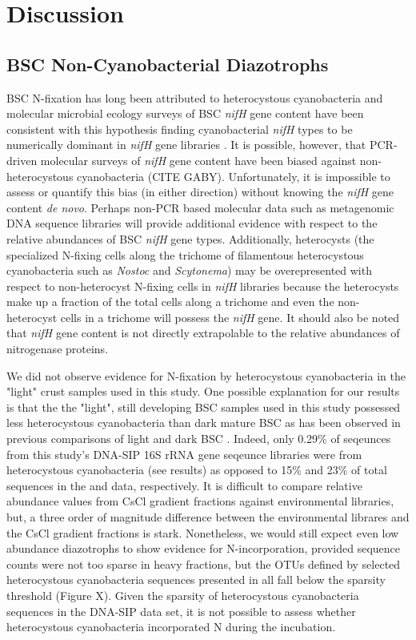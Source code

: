 \section{Discussion}

\subsection{BSC Non-Cyanobacterial Diazotrophs}
BSC N-fixation has long been attributed to heterocystous cyanobacteria and molecular microbial ecology surveys of BSC \textit{nifH} gene content have been consistent with this hypothesis finding cyanobacterial \textit{nifH} types to be numerically dominant in \textit{nifH} gene libraries \cite{Yeager,14766579,Yeager_2012}. It is possible, however, that PCR-driven molecular surveys of \textit{nifH} gene content have been biased against non-heterocystous cyanobacteria (CITE GABY). Unfortunately, it is impossible to assess or quantify this bias (in either direction) without knowing the \textit{nifH} gene content \textit{de novo}. Perhaps non-PCR based molecular data such as metagenomic DNA sequence libraries will provide additional evidence with respect to the relative abundances of BSC \textit{nifH} gene types. Additionally, heterocysts (the specialized N-fixing cells along the trichome of filamentous heterocystous cyanobacteria such as \textit{Nostoc} and \textit{Scytonema}) may be overepresented with respect to non-heterocyst N-fixing cells in \textit{nifH} libraries because the heterocysts make up a fraction of the total cells along a trichome and even the non-heterocyst cells in a trichome will possess the \textit{nifH} gene. It should also be noted that \textit{nifH} gene content is not directly extrapolable to the relative abundances of nitrogenase proteins.

We did not observe evidence for N-fixation by heterocystous cyanobacteria in the "light" crust samples used in this study. One possible explanation for our results is that the the "light", still developing BSC samples used in this study possessed less heterocystous cyanobacteria than dark mature BSC as has been observed in previous comparisons of light and dark BSC \cite{14766579}. Indeed, only 0.29\% of seqeunces from this study's DNA-SIP 16S rRNA gene seqeunce libraries were from heterocystous cyanobacteria (see results) as opposed to 15\% and 23\% of total sequences in the \citet{Steven_2013} and \citet{Garcia_Pichel_2013} data, respectively. It is difficult to compare relative abundance values from CsCl gradient fractions against environmental libraries, but, a three order of magnitude difference between the environmental librares and the CsCl gradient fractions is stark. Nonetheless, we would still expect even low abundance diazotrophs to show evidence for N-incorporation, provided sequence counts were not too sparse in heavy fractions, but the OTUs defined by selected heterocystous cyanobacteria sequences presented in \citet{Yeager} all fall below the sparsity threshold (Figure X). Given the sparsity of heterocystous cyanobacteria sequences in the DNA-SIP data set, it is not possible to assess whether heterocystous cyanobacteria incorporated N during the incubation.

